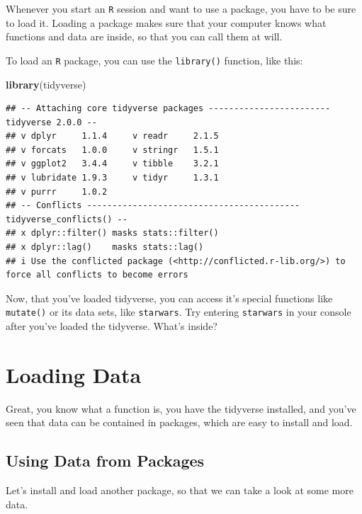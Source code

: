 \documentclass[
]{book}
\newenvironment{Shaded}{\begin{snugshade}}{\end{snugshade}}
\newcommand{\FunctionTok}[1]{\textcolor[rgb]{0.13,0.29,0.53}{\textbf{#1}}}
\newcommand{\NormalTok}[1]{#1}
\begin{document}
Whenever you start an \texttt{R} session and want to use a package, you have to be sure to load it. Loading a package makes sure that your computer knows what functions and data are inside, so that you can call them at will.

To load an \texttt{R} package, you can use the \texttt{library()} function, like this:

\begin{Shaded}
\begin{Highlighting}[]
\FunctionTok{library}\NormalTok{(tidyverse)}
\end{Highlighting}
\end{Shaded}

\begin{verbatim}
## -- Attaching core tidyverse packages ------------------------ tidyverse 2.0.0 --
## v dplyr     1.1.4     v readr     2.1.5
## v forcats   1.0.0     v stringr   1.5.1
## v ggplot2   3.4.4     v tibble    3.2.1
## v lubridate 1.9.3     v tidyr     1.3.1
## v purrr     1.0.2     
## -- Conflicts ------------------------------------------ tidyverse_conflicts() --
## x dplyr::filter() masks stats::filter()
## x dplyr::lag()    masks stats::lag()
## i Use the conflicted package (<http://conflicted.r-lib.org/>) to force all conflicts to become errors
\end{verbatim}

Now, that you've loaded tidyverse, you can access it's special functions like \texttt{mutate()} or its data sets, like \texttt{starwars}. Try entering \texttt{starwars} in your console after you've loaded the tidyverse. What's inside?

\hypertarget{loading-data}{%
\section{Loading Data}\label{loading-data}}

Great, you know what a function is, you have the tidyverse installed, and you've seen that data can be contained in packages, which are easy to install and load.

\hypertarget{using-data-from-packages}{%
\subsection{Using Data from Packages}\label{using-data-from-packages}}

Let's install and load another package, so that we can take a look at some more data.
\end{document}
